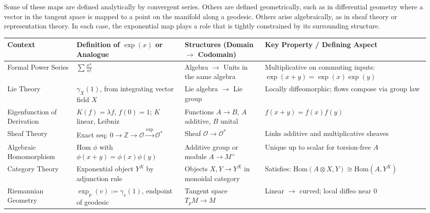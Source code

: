 Some of these maps are defined analytically by convergent series. Others are defined geometrically, such as in differential geometry where a vector in the tangent space is mapped to a point on the manifold along a geodesic. Others arise algebraically, as in sheaf theory or representation theory. In each case, the exponential map plays a role that is tightly constrained by its surrounding structure.


\begin{center}
\renewcommand{\arraystretch}{1.5}
\setlength{\tabcolsep}{2pt}
\footnotesize
\begin{tabular}{|>{\centering\arraybackslash}m{2.0cm}|>{\centering\arraybackslash}m{2.8cm}|>{\centering\arraybackslash}m{3.8cm}|>{\centering\arraybackslash}m{4.2cm}|}
\hline
\textbf{Context} &
\textbf{Definition of \( \exp(x) \) or Analogue} &
\textbf{Structures (Domain \( \to \) Codomain)} &
\textbf{Key Property / Defining Aspect} \\
\hline
Formal Power Series &
\( \sum \frac{x^n}{n!} \) &
Algebra \( \to \) Units in the same algebra &
Multiplicative on commuting inputs: \( \exp(x+y) = \exp(x)\exp(y) \) \\
\hline
Lie Theory &
\( \gamma_X(1) \), from integrating vector field \( X \) &
Lie algebra \( \to \) Lie group &
Locally diffeomorphic; flows compose via group law \\
\hline
Eigenfunction of Derivation &
\( K(f) = \lambda f \), \( f(0) = 1 \); \( K \) linear, Leibniz &
Functions \( A \to B \), \( A \) additive, \( B \) unital &
\( f(x+y) = f(x)f(y) \) \\
\hline
Sheaf Theory &
Exact seq: \( 0 \to \mathbb{Z} \to \mathcal{O} \xrightarrow{\exp} \mathcal{O}^* \) &
Sheaf \( \mathcal{O} \to \mathcal{O}^* \) &
Links additive and multiplicative sheaves \\
\hline
Algebraic Homomorphism &
Hom \( \phi \) with \( \phi(x+y) = \phi(x)\phi(y) \) &
Additive group or module \( A \to M^\times \) &
Unique up to scalar for torsion-free \( A \) \\
\hline
Category Theory &
Exponential object \( Y^X \) by adjunction rule &
Objects \( X, Y \to Y^X \) in monoidal category &
Satisfies: \( \mathrm{Hom}(A \otimes X, Y) \cong \mathrm{Hom}(A, Y^X) \) \\
\hline
Riemannian Geometry &
\( \exp_p(v) := \gamma_v(1) \), endpoint of geodesic &
Tangent space \( T_p M \to M \) &
Linear \(\to\) curved; local diffeo near \( 0 \) \\
\hline
\end{tabular}
\end{center}

